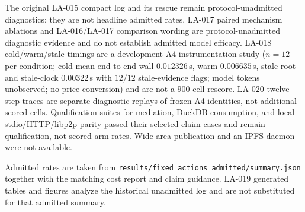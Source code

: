 The original LA-015 compact log and its rescue remain protocol-unadmitted diagnostics; they are not headline admitted rates. LA-017 paired mechanism ablations and LA-016/LA-017 comparison wording are protocol-unadmitted diagnostic evidence and do not establish admitted model efficacy. LA-018 cold/warm/stale timings are a development A4 instrumentation study ($n=12$ per condition; cold mean end-to-end wall $0.012326$\,s, warm $0.006635$\,s, stale-root and stale-clock $0.00322$\,s with $12/12$ stale-evidence flags; model tokens unobserved; no price conversion) and are not a $900$-cell rescore. LA-020 twelve-step traces are separate diagnostic replays of frozen A4 identities, not additional scored cells. Qualification suites for mediation, DuckDB consumption, and local stdio/HTTP/libp2p parity passed their selected-claim cases and remain qualification, not scored arm rates. Wide-area publication and an IPFS daemon were not available.

Admitted rates are taken from \texttt{results/fixed\_actions\_admitted/summary.json} together with the matching cost report and claim guidance. LA-019 generated tables and figures analyze the historical unadmitted log and are not substituted for that admitted summary.
